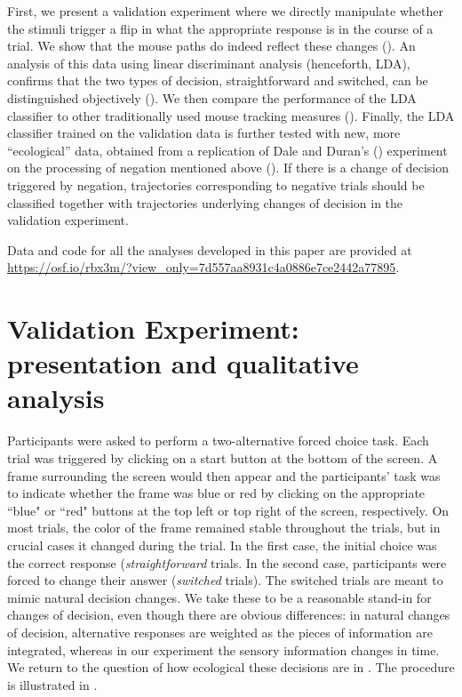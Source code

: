 \documentclass[11pt]{article}
\begin{document}
First, we present a validation experiment where we directly manipulate whether the stimuli trigger a flip in what the appropriate response is in the course of a trial.
We show that the mouse paths do indeed reflect these changes (). 
An analysis of this data using linear discriminant analysis (henceforth, LDA), confirms that the two types of decision, straightforward 
and switched, can be distinguished objectively (). 
We then compare the performance of the LDA classifier to other traditionally used mouse tracking measures (). 
Finally, the LDA classifier trained on the validation data is further tested with new, more ``ecological'' data, obtained from a replication of Dale and Duran's (\citeyear{Dale2011}) experiment on the processing of negation mentioned above (). If there is a change of decision triggered by negation, trajectories corresponding to negative trials should be classified together with trajectories underlying changes of decision in the validation experiment. 

Data and code for all the analyses developed in this paper are provided at \url{https://osf.io/rbx3m/?view_only=7d557aa8931c4a0886e7ce2442a77895}.

\section{Validation Experiment: presentation and qualitative analysis}
\label{section:validation}

Participants were asked to perform a two-alternative forced choice task. Each trial was triggered by clicking on a start button at the bottom of the screen. A frame surrounding the screen would then appear and the participants' task was to indicate whether the frame was blue or red by clicking on the appropriate ``blue" or ``red" buttons at the top left or top right of the screen, respectively. %
On most trials, the color of the frame remained stable throughout the trials, but in crucial cases it changed during the trial.
In the first case, the initial choice was the correct response (\textit{straightforward} trials. In the second case, participants were forced to change their answer (\textit{switched} trials). The switched trials are meant to mimic natural decision changes. We take these to be a reasonable stand-in for changes of decision, even though there are obvious differences: in natural changes of decision, alternative responses are weighted as the pieces of information are integrated, whereas in our experiment the sensory information changes in time.
We return to the question of how ecological these decisions are in .
The procedure is illustrated in . 
\end{document}
